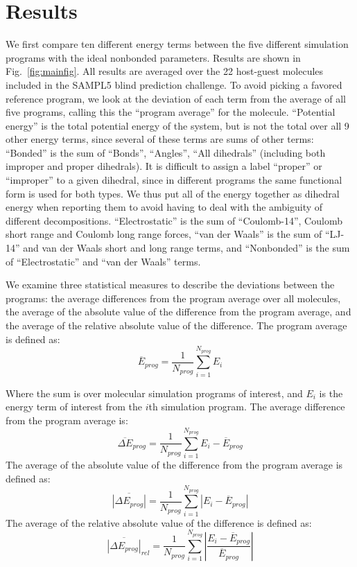 \section*{Results}
We first compare ten different energy terms between the five different
simulation programs with the ideal nonbonded parameters.  Results are
shown in Fig.~\ref{fig:mainfig}. All results are averaged over the 22
host-guest molecules included in the SAMPL5 blind prediction
challenge. To avoid picking a favored reference program, we look at
the deviation of each term from the average of all five programs,
calling this the ``program average'' for the molecule.  ``Potential
energy'' is the total potential energy of the system, but is not the
total over all 9 other energy terms, since several of these terms are
sums of other terms: ``Bonded'' is the sum of ``Bonds'', ``Angles'',
``All dihedrals'' (including both improper and proper dihedrals). 
It is difficult to assign a label ``proper'' or ``improper'' to a
given dihedral, since in different programs the same functional form
is used for both types. We thus put all of the energy together as
dihedral energy when reporting them to avoid having to deal with the
ambiguity of different decompositions.
``Electrostatic'' is the sum of ``Coulomb-14'', Coulomb short range
and Coulomb long range forces, ``van der Waals'' is the sum of
``LJ-14'' and van der Waals short and long range terms, and
``Nonbonded'' is the sum of ``Electrostatic'' and ``van der Waals''
terms.

We examine three statistical measures to describe the deviations
between the programs: the average differences from the program average
over all molecules, the average of the absolute value of the
difference from the program average, and the average of the relative absolute value of the difference. 
The program average is defined as: 
\[  \overline{E}_{prog} = \frac{1}{N_{prog}}\sum_{i=1}^{N_{prog}} E_i \]

Where the sum is over molecular simulation programs of interest, and $E_i$ is the energy term of interest from the $i$th simulation program.  The average difference from the program average is: 
\[  \overline{\Delta E}_{prog} = \frac{1}{N_{prog}}\sum_{i=1}^{N_{prog}} E_i - \overline{E}_{prog} \]
The average of the absolute value of the difference from the program average is defined as:
\[  \overline{\left|\Delta E_{prog}\right|} = \frac{1}{N_{prog}}\sum_{i=1}^{N_{prog}} \left|E_i - \overline{E}_{prog}\right| \]
The average of the relative absolute value of the difference is defined as:
\[  \overline{\left|\Delta E_{prog}\right|}_{rel} = \frac{1}{N_{prog}}\sum_{i=1}^{N_{prog}} \left|\frac{E_i - \overline{E}_{prog}}{\overline{E}_{prog}}\right| \]


